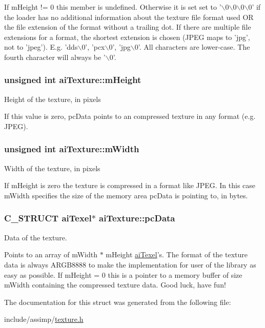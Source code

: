 \-If m\-Height != 0 this member is undefined. \-Otherwise it is set set to '$\backslash$0$\backslash$0$\backslash$0$\backslash$0' if the loader has no additional information about the texture file format used \-O\-R the file extension of the format without a trailing dot. \-If there are multiple file extensions for a format, the shortest extension is chosen (\-J\-P\-E\-G maps to 'jpg', not to 'jpeg'). \-E.\-g. 'dds$\backslash$0', 'pcx$\backslash$0', 'jpg$\backslash$0'. \-All characters are lower-\/case. \-The fourth character will always be '$\backslash$0'. \hypertarget{structaiTexture_ac1e2fa6f1f646e9c55e3985d4418a752}{
\subsubsection[{m\-Height}]{\setlength{\rightskip}{0pt plus 5cm}unsigned int {\bf ai\-Texture\-::m\-Height}}}\label{structaiTexture_ac1e2fa6f1f646e9c55e3985d4418a752}
\-Height of the texture, in pixels

\-If this value is zero, pc\-Data points to an compressed texture in any format (e.\-g. \-J\-P\-E\-G). \hypertarget{structaiTexture_aaa3ad8cfe44fdc4dea2db91977d92234}{
\subsubsection[{m\-Width}]{\setlength{\rightskip}{0pt plus 5cm}unsigned int {\bf ai\-Texture\-::m\-Width}}}\label{structaiTexture_aaa3ad8cfe44fdc4dea2db91977d92234}
\-Width of the texture, in pixels

\-If m\-Height is zero the texture is compressed in a format like \-J\-P\-E\-G. \-In this case m\-Width specifies the size of the memory area pc\-Data is pointing to, in bytes. \hypertarget{structaiTexture_aeb07528748b6e49d2d81c60006024f9a}{
\subsubsection[{pc\-Data}]{\setlength{\rightskip}{0pt plus 5cm}\-C\-\_\-\-S\-T\-R\-U\-C\-T {\bf ai\-Texel}$\ast$ {\bf ai\-Texture\-::pc\-Data}}}\label{structaiTexture_aeb07528748b6e49d2d81c60006024f9a}
\-Data of the texture.

\-Points to an array of m\-Width $\ast$ m\-Height \hyperlink{structaiTexel}{ai\-Texel}'s. \-The format of the texture data is always \-A\-R\-G\-B8888 to make the implementation for user of the library as easy as possible. \-If m\-Height = 0 this is a pointer to a memory buffer of size m\-Width containing the compressed texture data. \-Good luck, have fun! 

\-The documentation for this struct was generated from the following file\-:\begin{DoxyCompactItemize}
\item 
include/assimp/\hyperlink{texture_8h}{texture.\-h}\end{DoxyCompactItemize}

